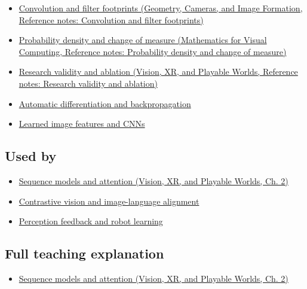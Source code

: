 \begin{itemize}
\tightlist
\item
  \href{../03-Geometry-Cameras-and-Image-Formation/main.pdf\#nameddest=appendix-d5b3c692d9f0}{Convolution and filter footprints (Geometry, Cameras, and Image Formation, Reference notes: Convolution and filter footprints)}
\item
  \href{../02-Mathematics-for-Visual-Computing/main.pdf\#nameddest=appendix-4815cd87ab8b}{Probability density and change of measure (Mathematics for Visual Computing, Reference notes: Probability density and change of measure)}
\item
  \href{../07-Vision-XR-and-Playable-Worlds/main.pdf\#nameddest=appendix-65788587ef78}{Research validity and ablation (Vision, XR, and Playable Worlds, Reference notes: Research validity and ablation)}
\item
  \hyperref[appendix-40df0855b4a7]{Automatic differentiation and backpropagation}
\item
  \hyperref[appendix-47c51ea026fb]{Learned image features and CNNs}
\end{itemize}

\subsection{Used by}\label{appendix-a9d5dfdd164a-used-by}

\begin{itemize}
\tightlist
\item
  \href{../07-Vision-XR-and-Playable-Worlds/main.pdf\#nameddest=04-visual-computing-ii-ch031-sequence-models-and-attention}{Sequence models and attention (Vision, XR, and Playable Worlds, Ch. 2)}
\item
  \hyperref[appendix-772f1fd96148]{Contrastive vision and image-language alignment}
\item
  \hyperref[appendix-b0c42da325f1]{Perception feedback and robot learning}
\end{itemize}

\subsection{Full teaching explanation}\label{appendix-a9d5dfdd164a-full-teaching-explanation}

\begin{itemize}
\tightlist
\item
  \href{../07-Vision-XR-and-Playable-Worlds/main.pdf\#nameddest=04-visual-computing-ii-ch031-sequence-models-and-attention}{Sequence models and attention (Vision, XR, and Playable Worlds, Ch. 2)}
\end{itemize}

